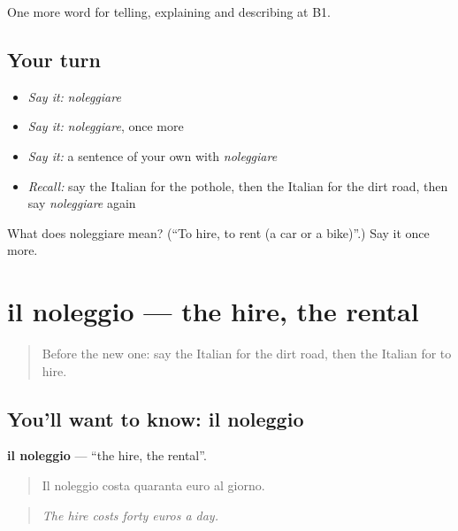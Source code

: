 \begin{grammarlens}[title={What you've built}]
One more word for telling, explaining and describing at B1.
\end{grammarlens}

\subsection*{Your turn}
\begin{itemize}
\raggedright
  \item \emph{Say it:} \emph{noleggiare}
  \item \emph{Say it:} \emph{noleggiare}, once more
  \item \emph{Say it:} a sentence of your own with \emph{noleggiare}
  \item \emph{Recall:} say the Italian for the pothole, then the Italian for the dirt road, then say \emph{noleggiare} again
\end{itemize}

\begin{tcolorbox}[breakable,colback=teal!4,colframe=teal!35!black,title={Before you move on}]
What does noleggiare mean? (\textquotedblleft{}To hire, to rent (a car or a bike)\textquotedblright{}.) Say it once more.
\end{tcolorbox}
\section[il noleggio]{il noleggio — the hire, the rental}

\label{lesson:IT-C415-noleggio}



\begin{quote}
Before the new one: say the Italian for the dirt road, then the Italian for to hire.
\end{quote}

\subsection*{You'll want to know: il noleggio}
\textbf{il noleggio} — \textquotedblleft{}the hire, the rental\textquotedblright{}.

\begin{quote}
Il noleggio costa quaranta euro al giorno.
\end{quote}

\begin{quote}
\emph{The hire costs forty euros a day.}
\end{quote}

